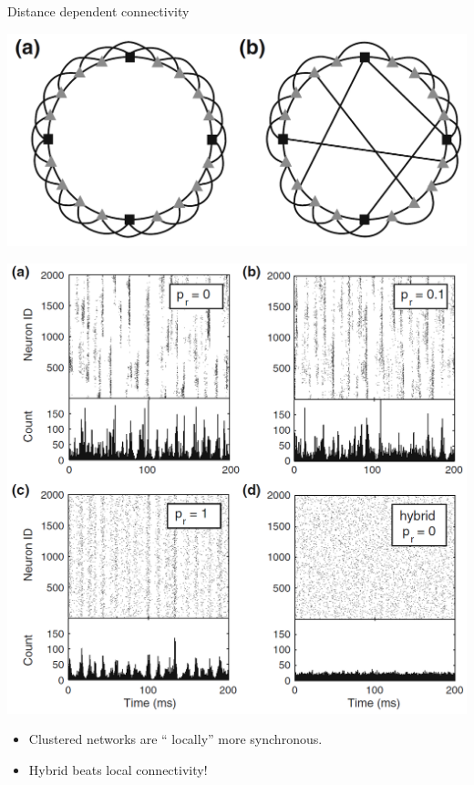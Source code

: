 \documentclass[fleqn]{beamer}
\newcommand{\curldoquom}[1]{\textquotedblleft
#1\textquotedblright\hspace{.01mm}}
\newcommand{\ppc}[1]{\pause\setcounter{page}{#1}}
\begin{document}
\begin{frame}{Distance dependent connectivity}
  \begin{minipage}{.38\linewidth}
   \begin{center}
    \includegraphics[width=.9\textwidth]{figures/kriener_dist1a}
   \end{center}
        \begin{flushright}
      {\footnotesize \cite{Kriener2009}}
    \end{flushright}
  \end{minipage}\ppc{11}
\begin{minipage}{.58\linewidth}
 \begin{center}
    \includegraphics[width=.9\textwidth]{figures/kriener_dist2}
 \end{center}
 \vspace*{.2cm}
\end{minipage}
    \begin{itemize}
      \item Clustered networks are \curldoquom{locally} more synchronous.
      \item Hybrid beats local connectivity!
    \end{itemize}
\end{frame}
\end{document}
